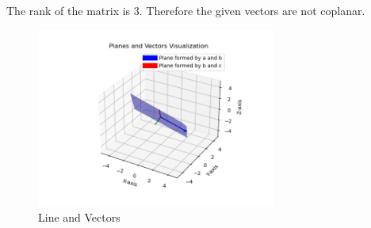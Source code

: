 \documentclass[journal]{IEEEtran}
\begin{document}
The rank of the matrix is 3. Therefore the given vectors are not coplanar.
\newpage
\begin{figure}[h!]
\begin{center}
	\includegraphics[width=0.7\textwidth]{Fig/fig.png}
	\caption{Line and Vectors}
	\label{fig:4-4.4-32 - Figure -1}
\end{center}
\end{figure}
\end{document}
